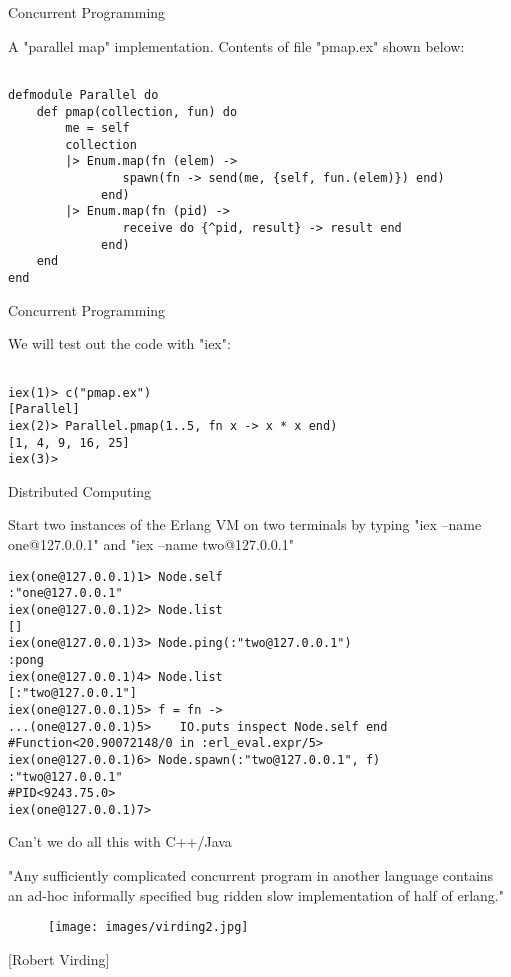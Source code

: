 \documentclass{beamer}
\begin{document}
\begin{frame}[fragile]{Concurrent Programming}

A "parallel map" implementation.
Contents of file "pmap.ex" shown below:

\begin{verbatim}

defmodule Parallel do
    def pmap(collection, fun) do
        me = self
        collection
        |> Enum.map(fn (elem) ->
                spawn(fn -> send(me, {self, fun.(elem)}) end)
             end)
        |> Enum.map(fn (pid) ->
                receive do {^pid, result} -> result end
             end)
    end
end
\end{verbatim}
\end{frame}
\begin{frame}[fragile]{Concurrent Programming}

We will test out the code with "iex":

\begin{verbatim}

iex(1)> c("pmap.ex")
[Parallel]
iex(2)> Parallel.pmap(1..5, fn x -> x * x end)
[1, 4, 9, 16, 25]
iex(3)> 

\end{verbatim}

\end{frame}

\begin{frame}[fragile]{Distributed Computing}

Start two instances of the Erlang VM on two terminals by
typing "iex --name one@127.0.0.1" and "iex --name two@127.0.0.1"

\begin{verbatim}
iex(one@127.0.0.1)1> Node.self
:"one@127.0.0.1"
iex(one@127.0.0.1)2> Node.list
[]
iex(one@127.0.0.1)3> Node.ping(:"two@127.0.0.1")
:pong
iex(one@127.0.0.1)4> Node.list
[:"two@127.0.0.1"]
iex(one@127.0.0.1)5> f = fn -> 
...(one@127.0.0.1)5>    IO.puts inspect Node.self end
#Function<20.90072148/0 in :erl_eval.expr/5>
iex(one@127.0.0.1)6> Node.spawn(:"two@127.0.0.1", f)
:"two@127.0.0.1"
#PID<9243.75.0>
iex(one@127.0.0.1)7>
\end{verbatim}

\end{frame}

\begin{frame}[fragile]{Can't we do all this with C++/Java}

"Any sufficiently complicated concurrent program in another
language contains an ad-hoc informally specified bug ridden
slow implementation of half of erlang."

\begin{figure}
\texttt{[image: images/virding2.jpg]}
\end{figure}
[Robert Virding]
\end{frame}
\end{document}
